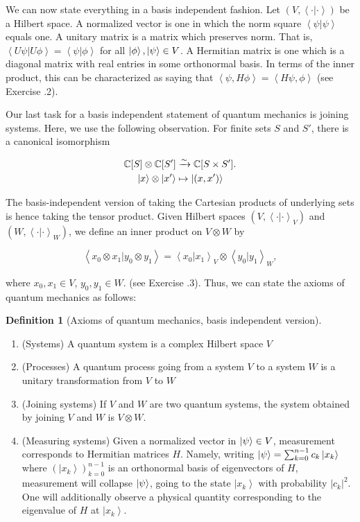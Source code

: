 \documentclass{article}
\theoremstyle{definition}
\newtheorem*{definition}{Definition}
\numberwithin{figure}{section}
\begin{document}
We can now state everything in a basis independent fashion. Let $(V,\left<\cdot | \cdot\right>)$ be a Hilbert space. A normalized vector is one in which the norm square $\left<\psi|\psi\right>$ equals one. A unitary matrix is a matrix which preserves norm. That is, $\left<U\psi|U\phi\right>=\left<\psi|\phi\right>$ for all $\left|\phi\right>,\left|\psi\right>\in V$. A Hermitian matrix is one which is a diagonal matrix with real entries in some orthonormal basis. In terms of the inner product, this can be characterized as saying that $\left<\psi, H\phi\right>=\left<H\psi, \phi \right>$ (see Exercise \thesection.2).

Our last task for a basis independent statement of quantum mechanics is joining systems. Here, we use the following observation. For finite sets $S$ and $S'$, there is a canonical isomorphism

\begin{align*}
\mathbb{C}[S]\otimes \mathbb{C}[S']&\xrightarrow{\sim}\mathbb{C}[S\times S'].\\
\left|x\right>\otimes \left|x'\right>&\mapsto \left|(x,x')\right>
\end{align*}

The basis-independent version of taking the Cartesian products of underlying sets is hence taking the tensor product. Given Hilbert spaces $(V,\left<\cdot|\cdot\right>_V)$ and $(W,\left<\cdot|\cdot\right>_W)$, we define an inner product on $V\otimes W$ by

$$\left<x_0\otimes x_1| y_0\otimes y_1\right>=\left<x_0|x_1\right>_{V}\otimes \left<y_0|y_1\right>_W,$$

where $x_0,x_1\in V$, $y_0,y_1\in W$. (see Exercise \thesection.3). Thus, we can state the axioms of quantum mechanics as follows:

\begin{definition}[Axioms of quantum mechanics, basis independent version] $\,$

\begin{enumerate}
\item (Systems) A quantum system is a complex Hilbert space $V$
\item (Processes) A quantum process going from a system $V$ to a system $W$ is a unitary transformation from $V$ to $W$
\item (Joining systems) If $V$ and $W$ are two quantum systems, the system obtained by joining $V$ and $W$ is $V\otimes W$.
\item (Measuring systems) Given a normalized vector in $\left|\psi\right>\in V$, measurement corresponds to Hermitian matrices $H$. Namely, writing $\left|\psi\right>=\sum_{k=0}^{n-1}c_k\left|x_k\right>$ where $\left(\left|x_k\right>\right)_{k=0}^{n-1}$ is an orthonormal basis of eigenvectors of $H$, measurement will collapse $\left|\psi\right>$, going to the state $\left|x_k\right>$ with probability $|c_k|^2$. One will additionally observe a physical quantity corresponding to the eigenvalue of $H$ at $\left|x_k\right>$.
\end{enumerate}

\raggedleft\qedsymbol{}
\end{definition}
\end{document}
